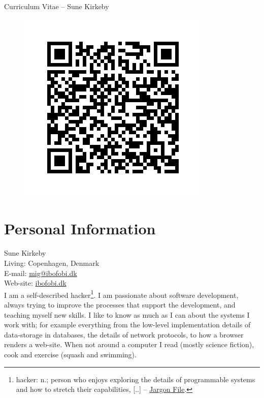 \documentclass[margin,line,a4paper]{resume}
\begin{document}
{\sc \Large Curriculum Vitae -- Sune Kirkeby}
\begin{resume}

\begin{figure}
\vspace{-1.3cm}
\begin{center}
\includegraphics[scale=0.2,bb=0 0 350 350]{qr.png}
\end{center}
\vspace{-1cm}
\end{figure}

\section{\mysidestyle Personal Information}\vspace{1mm}
Sune Kirkeby \\
Living: Copenhagen, Denmark \\
E-mail: \href{mailto:mig@ibofobi.dk}{mig@ibofobi.dk} \\
Web-site: \href{http://ibofobi.dk/}{ibofobi.dk}\\

I am a self-described hacker\footnote{hacker: n.;  person who enjoys exploring
the details of programmable systems and how to stretch their capabilities,
[..] -- \href{http://www.catb.org/jargon/html/H/hacker.html}{Jargon File}.}.
I am passionate about software development, always trying to improve the
processes that support the development, and teaching myself new skills. I like
to know as much as I can about the systems I work with; for example everything
from the low-level implementation details of data-storage in databases, the
details of network protocols, to how a browser renders a web-site.
When not around a computer I read (mostly science fiction), cook and exercise
(squash and swimming).


\end{resume}
\end{document}

